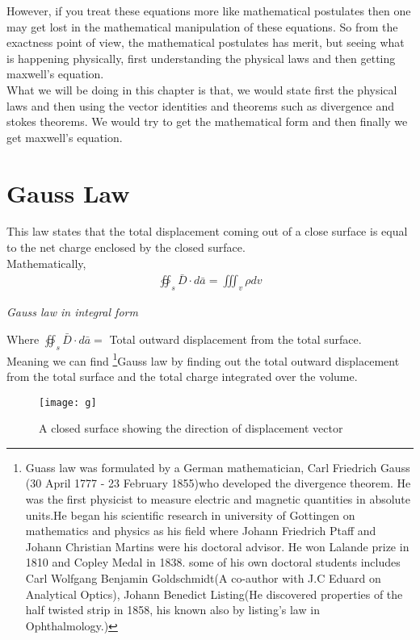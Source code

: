 However, if you treat these equations more like mathematical postulates then one may get lost in the mathematical manipulation of these equations. So from the exactness point of view, the mathematical postulates has merit, but seeing what is happening physically, first understanding the physical laws and then getting maxwell's equation. \\

What we will be doing in this chapter is that, we would state first the physical laws and then using the vector identities and theorems such as divergence and stokes theorems. We would try to get the mathematical form and then finally we get maxwell's equation.

\section{Gauss Law}
This law states that the total displacement coming out of a close surface is equal to the net charge enclosed by the closed surface.\\
Mathematically, 
\begin{align}
\boxed{\oiint_s\bar{D}\cdot{d\bar{a}} = \iiint_v\rho dv}
\end{align}
\begin{center}
	\emph{Gauss law in integral form}
\end{center}
Where $\oiint_s\bar{D}\cdot d\bar{a} =$ Total outward displacement from the total surface.\\
Meaning we can find \footnote[5]{Guass law was formulated by a German mathematician, Carl Friedrich Gauss (30 April 1777 - 23 February 1855)who developed the divergence theorem. He was the first physicist to measure  electric  and magnetic  quantities in absolute  units.He began his scientific research in university of Gottingen on mathematics and physics as his field where Johann Friedrich Ptaff and Johann Christian Martins were his doctoral advisor. He won Lalande prize in 1810 and Copley Medal in 1838. some of his own doctoral students includes Carl Wolfgang Benjamin Goldschmidt(A co-author with J.C Eduard on Analytical Optics), Johann Benedict Listing(He discovered properties of the half twisted strip in 1858, his known also by listing's law in Ophthalmology.) }Gauss law by finding out the total outward displacement from the total surface and the total charge integrated over the volume.\\
	
	\begin{figure}
		\centering
		\texttt{[image: g]}
		\caption{A closed surface showing the direction of displacement vector}
		\label{fig:g}
	\end{figure}
	

